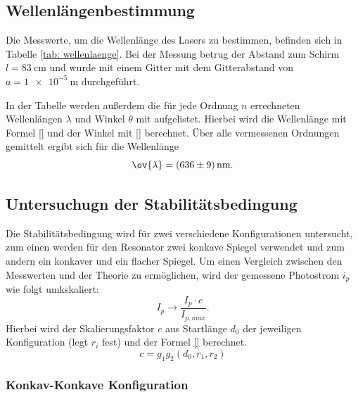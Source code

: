 \subsection{Wellenlängenbestimmung}
Die Messwerte, um die Wellenlänge des Lasers zu bestimmen, befinden sich in Tabelle  \ref{tab: wellenlaenge}.
Bei der Messung betrug der Abstand zum Schirm $l=\SI{83}{\centi\meter}$ %
und wurde mit einem Gitter mit dem Gitterabstand von $a=\SI{1e-5}{\meter}$ durchgeführt. %

In der Tabelle werden außerdem die für jede Ordnung $n$ errechneten Wellenlängen $\lambda$ und Winkel $\theta$
mit aufgelistet. Hierbei wird die Wellenlänge mit Formel \eqref{} und der Winkel mit \eqref{} berechnet. %
Über alle vermessenen Ordnungen gemittelt ergibt sich für die Wellenlänge
\begin{equation}
  \label{eq: mittelwert_wellenlaenge}
  \ov{\lambda}=\SI{636\pm9}{\nano\meter}.
\end{equation}
\FloatBarrier
\FloatBarrier
\subsection{Untersuchugn der Stabilitätsbedingung} %
Die Stabilitätsbedingung wird für zwei verschiedene Konfigurationen untersucht,
zum einen werden für den Resonator zwei konkave Spiegel verwendet und zum andern %
ein konkaver und ein flacher Spiegel. %
Um einen Vergleich zwischen den Messwerten und der Theorie zu ermöglichen, wird der gemessene
Photostrom $i_p$ wie folgt umkskaliert: %
\begin{equation*}
  I_p \rightarrow \frac{I_p\cdot c}{I_{p,max}}.
\end{equation*}
Hierbei wird der Skalierungsfaktor $c$ aus Startlänge $d_0$ der jeweiligen Konfiguration (legt $r_i$ fest) und der Formel
\eqref{} berechnet. %
\begin{equation*}
  c=g_1g_2(d_0, r_1, r_2)
\end{equation*}

\FloatBarrier
\FloatBarrier
\subsubsection{Konkav-Konkave Konfiguration} %

